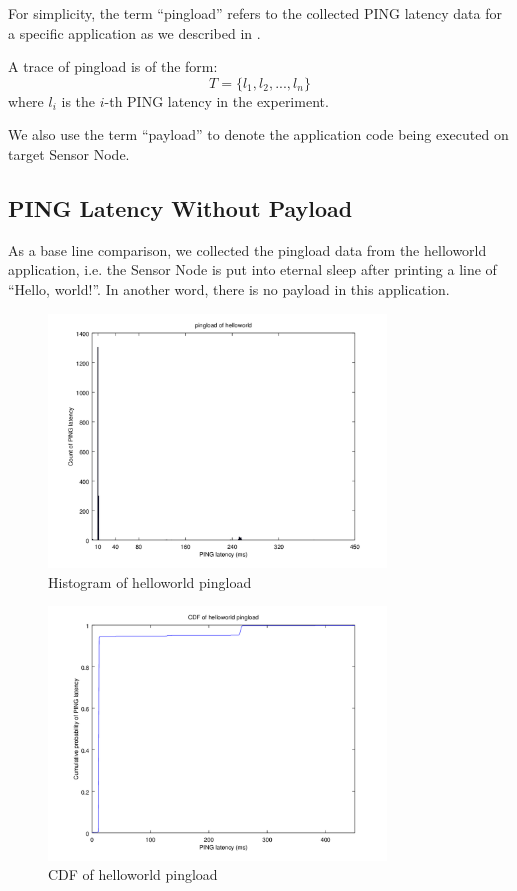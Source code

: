 For simplicity, the term ``pingload'' refers to the collected PING latency data for a specific application as we described in .

\begin{definition}
	A trace of pingload is of the form:
	\begin{equation*}
		T=\{l_1, l_2, ..., l_n\}
	\end{equation*}
	where $l_i$ is the $i$-th PING latency in the experiment.
\end{definition}

We also use the term ``payload'' to denote the application code being executed on target Sensor Node.

\subsection{PING Latency Without Payload} \label{Sleep PINGLOAD}

As a base line comparison, we collected the pingload data from the helloworld application, i.e. the Sensor Node is put into eternal sleep after printing a line of ``Hello, world!''. In another word, there is no payload in this application.


\begin{figure}[h!]
	\centering
	\includegraphics[width=0.8\textwidth]{fig/helloworld.png}
	\caption{Histogram of helloworld pingload}
\end{figure}

\begin{figure}[h!]
	\centering
	\includegraphics[width=0.8\textwidth]{fig/helloworldcdf.png}
	\caption{CDF of helloworld pingload}
\end{figure}

